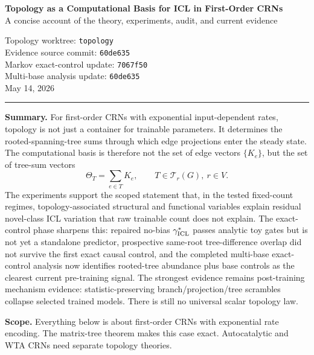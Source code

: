\documentclass[11pt]{article}
\newcommand{\T}{\mathcal T}
\begin{document}
\thispagestyle{empty}

\noindent
\begin{minipage}[t]{0.60\textwidth}
\raggedright
\textbf{Topology as a Computational Basis for ICL in First-Order CRNs}\\
A concise account of the theory, experiments, audit, and current evidence
\end{minipage}%
\begin{minipage}[t]{0.40\textwidth}
\raggedleft
Topology worktree: \texttt{topology}\\
Evidence source commit: \texttt{60de635}\\
Markov exact-control update: \texttt{7067f50}\\
Multi-base analysis update: \texttt{60de635}\\
May 14, 2026
\end{minipage}

\vspace{0.5em}
\noindent\rule{\textwidth}{0.4pt}
\vspace{1.0em}

\noindent\textbf{Summary.}
For first-order CRNs with exponential input-dependent rates, topology is not just a container for trainable parameters. It determines the rooted-spanning-tree sums through which edge projections enter the steady state. The computational basis is therefore not the set of edge vectors $\{K_e\}$, but the set of tree-sum vectors
\[
\boxed{\;\Theta_T=\sum_{e\in T}K_e,\qquad T\in\T_r(G),\ r\in V.\;}
\]
The experiments support the scoped statement that, in the tested fixed-count regimes, topology-associated structural and functional variables explain residual novel-class ICL variation that raw trainable count does not explain. The exact-control phase sharpens this: repaired no-bias $\gamma^\ast_{\rm ICL}$ passes analytic toy gates but is not yet a standalone predictor, prospective same-root tree-difference overlap did not survive the first exact causal control, and the completed multi-base exact-control analysis now identifies rooted-tree abundance plus base controls as the clearest current pre-training signal. The strongest evidence remains post-training mechanism evidence: statistic-preserving branch/projection/tree scrambles collapse selected trained models. There is still no universal scalar topology law.

\vspace{0.6em}
\noindent\textbf{Scope.}
Everything below is about first-order CRNs with exponential rate encoding. The matrix-tree theorem makes this case exact. Autocatalytic and WTA CRNs need separate topology theories.
\end{document}
